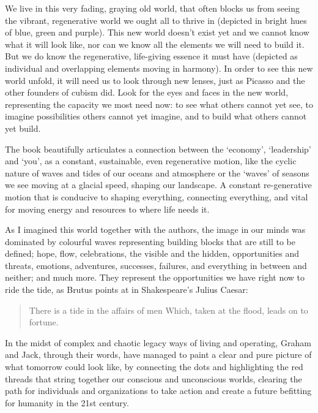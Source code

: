 We live in this very fading, graying old world, that often blocks us from seeing the vibrant, regenerative world we ought all to thrive in (depicted in bright hues of blue, green and purple). This new world doesn’t exist yet and we cannot know what it will
look like, nor can we know all the elements we will need to build it. But we do
know the regenerative, life\hyp{}giving essence it must have (depicted as individual and overlapping elements moving in harmony). In order to see this new world unfold, it will need us to look through new lenses, just as Picasso and the other founders of cubism did. Look for the eyes and faces in the new world, representing the capacity we most need now: to see what others cannot yet see, to imagine possibilities others cannot yet imagine, and to build what others cannot yet build.


The book beautifully articulates a connection between the ‘economy’, ‘leadership’ and ‘you’, as a constant, sustainable, even regenerative motion, like the cyclic nature of waves and tides of our oceans and atmosphere or the ‘waves’ of seasons we see moving at a glacial speed, shaping our landscape. A constant re\hyp{}generative motion that is conducive to shaping everything, connecting everything, and vital for moving energy and resources to where life needs it.


As I imagined this world together with the authors, the image in our minds was dominated by colourful waves representing building blocks that are still to be defined; hope, flow, celebrations, the visible and the hidden, opportunities and threats, emotions, adventures, successes, failures, and everything in between and neither; and much more. They represent the opportunities we have right now to ride the tide, as Brutus points at in Shakespeare’s Julius Caesar:
\begin{quotation}
There is a tide in the affairs of men \newline
Which, taken at the flood, leads on to fortune. 
\end{quotation}


In the midst of complex and chaotic legacy ways of living and operating, Graham and Jack, through their words, have managed to paint a clear and pure picture of what tomorrow could look like, by connecting the dots and highlighting the red threads that string together our conscious and unconscious worlds, clearing the path for individuals and organizations to take action and create a future befitting for humanity in the 21st century. 




